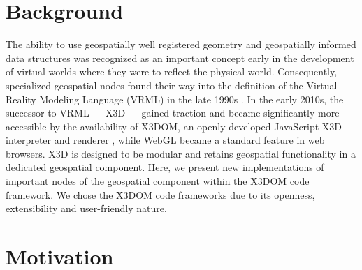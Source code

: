 \documentclass[review]{acmsiggraph}            %
\begin{document}

\begin{CRcatlist}  \end{CRcatlist}

\keywordlist

\section{Background}


\copyrightspace

The ability to use geospatially well registered geometry and geospatially informed data structures
was recognized as an important concept early in the development of virtual worlds where they were to
reflect the physical world. Consequently, specialized geospatial nodes found their way into the
definition of the Virtual Reality Modeling Language (VRML) in the late 1990s \cite{reddy2000}. In
the early 2010s, the successor to VRML --- X3D --- gained traction and became significantly more
accessible by the availability of X3DOM, an openly developed JavaScript X3D interpreter and renderer
\cite{behr09}, while WebGL became a standard feature in web browsers. X3D is designed to be modular
\cite{x3d05} and retains geospatial functionality in a dedicated geospatial component. Here, we
present new implementations of important nodes of the geospatial component within the X3DOM code
framework. We chose the X3DOM code frameworks due to its openness, extensibility and user-friendly nature. 

\section{Motivation}
\end{document}
